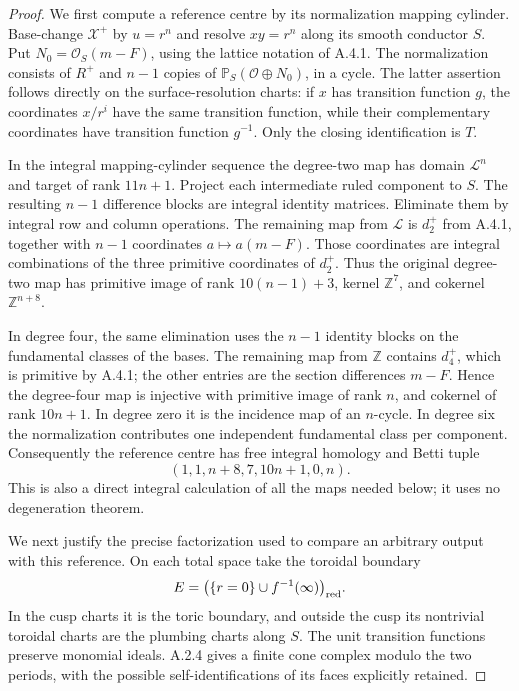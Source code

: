 \begin{proof}
We first compute a reference centre by its normalization
mapping cylinder. Base-change $\mathcal X^+$ by $u=r^n$
and resolve $xy=r^n$ along its smooth conductor $S$.
Put $N_0=\mathcal O_S(m-F)$, using the lattice notation
of A.4.1. The normalization consists of $R^+$ and
$n-1$ copies of $\mathbb P_S(\mathcal O\oplus N_0)$,
in a cycle. The latter assertion follows directly on
the surface-resolution charts: if $x$ has transition
function $g$, the coordinates $x/r^i$ have the same
transition function, while their complementary
coordinates have transition function $g^{-1}$.
Only the closing identification is $T$.

In the integral mapping-cylinder sequence the degree-two
map has domain $\mathcal L^n$ and target of rank $11n+1$.
Project each intermediate ruled component to $S$.
The resulting $n-1$ difference blocks are integral
identity matrices. Eliminate them by integral row and
column operations. The remaining map from $\mathcal L$
is $d_2^+$ from A.4.1, together with $n-1$ coordinates
$a\mapsto a(m-F)$. Those coordinates are integral
combinations of the three primitive coordinates of
$d_2^+$. Thus the original degree-two map has primitive
image of rank $10(n-1)+3$, kernel $\mathbb Z^7$, and
cokernel $\mathbb Z^{n+8}$.

In degree four, the same elimination uses the $n-1$
identity blocks on the fundamental classes of the bases.
The remaining map from $\mathbb Z$ contains $d_4^+$,
which is primitive by A.4.1; the other entries are the
section differences $m-F$. Hence the degree-four map
is injective with primitive image of rank $n$, and
cokernel of rank $10n+1$. In degree zero it is the
incidence map of an $n$-cycle. In degree six the
normalization contributes one independent fundamental
class per component. Consequently the reference centre
has free integral homology and Betti tuple
\[
 (1,1,n+8,7,10n+1,0,n).
\]
This is also a direct integral calculation of all the
maps needed below; it uses no degeneration theorem.

We next justify the precise factorization used to compare
an arbitrary output with this reference. On each total
space take the toroidal boundary
\[
 E=\bigl(\{r=0\}\cup f^{-1}(\infty)\bigr)_{\rm red}.
\]
In the cusp charts it is the toric boundary, and outside
the cusp its nontrivial toroidal charts are the plumbing
charts along $S$. The unit transition functions preserve
monomial ideals. A.2.4 gives a finite cone complex modulo
the two periods, with the possible self-identifications
of its faces explicitly retained.


\end{proof}
